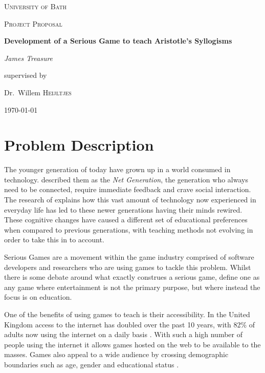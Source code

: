 \documentclass[12pt,a4paper]{report}
\begin{document}
\begin{titlepage}
	\centering
	{\scshape\LARGE University of Bath \par}
	\vspace{1cm}
	{\scshape\Large Project Proposal\par}
	\vspace{1.5cm}
	{\huge\bfseries Development of a Serious Game to teach Aristotle's Syllogisms\par}
	\vspace{2cm}
	{\Large\itshape James Treasure\par}
	\vfill
	supervised by\par
	Dr.~Willem \textsc{Heijltjes}
	\vfill
	{\large \today\par}
\end{titlepage}

\tableofcontents
\chapter{Problem Description}
The younger generation of today have grown up in a world consumed in technology. \cite{oblinger2005educating} described them as the \textit{Net Generation}, the generation who always need to be connected, require immediate feedback and crave social interaction. The research of \cite{prensky2001games} explains how this vast amount of technology now experienced in everyday life has led to these newer generations having their minds rewired. These cognitive changes have caused a different set of educational preferences when compared to previous generations, with teaching methods not evolving in order to take this in to account.

Serious Games are a movement within the game industry comprised of software developers and researchers who are using games to tackle this problem. Whilst there is some debate around what exactly construes a serious game, \cite{michael2005serious} define one as any game where entertainment is not the primary purpose, but where instead the focus is on education. 

One of the benefits of using games to teach is their accessibility. In the United Kingdom  access to the internet has doubled over the past 10 years, with 82\% of adults now using the internet on a daily basis \citep{onssurvey}. With such a high number of people using the internet it allows games hosted on the web to be available to the masses. Games also appeal to a wide audience by crossing demographic boundaries such as age, gender and educational status \citep{griffiths2002educational}. 
\end{document}
